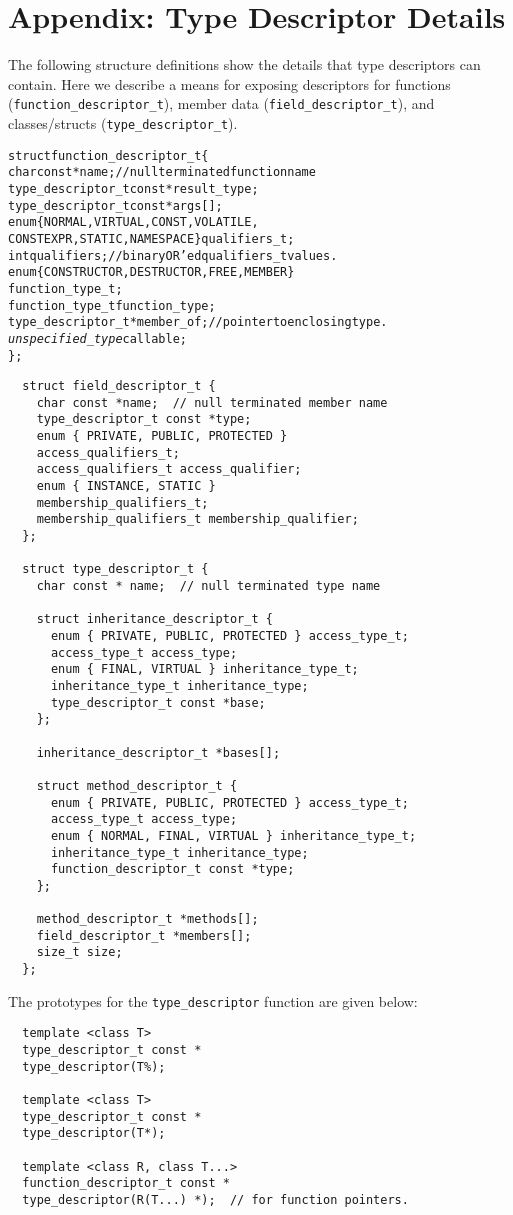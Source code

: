 \section{Appendix: Type Descriptor Details}
\label{appendix:type-descriptors-appendix}
The following structure definitions show the details that type descriptors can
contain. Here we describe a means for exposing descriptors for functions
(\verb+function_descriptor_t+), member data (\verb+field_descriptor_t+), and
classes/structs (\verb+type_descriptor_t+).

\begin{alltt}
  struct function\_descriptor\_t \{
    char const *name;  // null terminated function name
    type\_descriptor\_t const *result\_type;
    type\_descriptor\_t const *args[];
    enum \{ NORMAL, VIRTUAL, CONST, VOLATILE,
           CONSTEXPR, STATIC, NAMESPACE \} qualifiers\_t;
    int qualifiers;  // binary OR’ed qualifiers\_t values.
    enum \{ CONSTRUCTOR, DESTRUCTOR, FREE, MEMBER \}
    function\_type\_t;
    function\_type\_t function\_type;
    type\_descriptor\_t *member\_of;  // pointer to enclosing type.
    \emph{unspecified\_type} callable;
  \};
\end{alltt}
\begin{verbatim}
  struct field_descriptor_t {
    char const *name;  // null terminated member name
    type_descriptor_t const *type;
    enum { PRIVATE, PUBLIC, PROTECTED }
    access_qualifiers_t;
    access_qualifiers_t access_qualifier;
    enum { INSTANCE, STATIC }
    membership_qualifiers_t;
    membership_qualifiers_t membership_qualifier;
  };

  struct type_descriptor_t {
    char const * name;  // null terminated type name

    struct inheritance_descriptor_t {
      enum { PRIVATE, PUBLIC, PROTECTED } access_type_t;
      access_type_t access_type;
      enum { FINAL, VIRTUAL } inheritance_type_t;
      inheritance_type_t inheritance_type;
      type_descriptor_t const *base;
    };

    inheritance_descriptor_t *bases[];

    struct method_descriptor_t {
      enum { PRIVATE, PUBLIC, PROTECTED } access_type_t;
      access_type_t access_type;
      enum { NORMAL, FINAL, VIRTUAL } inheritance_type_t;
      inheritance_type_t inheritance_type;
      function_descriptor_t const *type;
    };

    method_descriptor_t *methods[];
    field_descriptor_t *members[];
    size_t size;
  };
\end{verbatim}

The prototypes for the \verb+type_descriptor+ function are given below:

\begin{verbatim}
  template <class T>
  type_descriptor_t const *
  type_descriptor(T%);

  template <class T>
  type_descriptor_t const *
  type_descriptor(T*);

  template <class R, class T...>
  function_descriptor_t const *
  type_descriptor(R(T...) *);  // for function pointers.
\end{verbatim}

